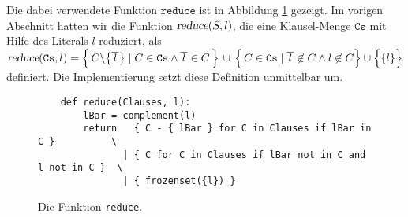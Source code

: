 Die dabei verwendete Funktion $\texttt{reduce}$ ist in Abbildung \ref{fig:reduce} gezeigt.
Im vorigen Abschnitt hatten wir die Funktion $\textsl{reduce}(S, l)$, die eine
Klausel-Menge $\texttt{Cs}$ mit Hilfe des Literals $l$ reduziert, als
\\[0.2cm]
\hspace*{1.3cm}
$\textsl{reduce}(\texttt{Cs},l)  = 
 \Bigl\{\, C \backslash \bigl\{\overline{\,l\,}\bigr\} \;|\; C \in \texttt{Cs} \wedge \overline{\,l\,} \in C \,\Bigr\} 
       \,\cup\, \Bigl\{\, C \in \texttt{Cs} \mid \overline{\,l\,} \not\in C \wedge l \not\in C \Bigr\} \cup \Bigl\{\{l\}\Bigr\}
$
\\[0.2cm]
definiert.
Die Implementierung setzt diese Definition unmittelbar um.  


\begin{figure}[!ht]
  \centering
\begin{verbatim}
    def reduce(Clauses, l):
        lBar = complement(l)
        return   { C - { lBar } for C in Clauses if lBar in C }          \
               | { C for C in Clauses if lBar not in C and l not in C }  \
               | { frozenset({l}) }
\end{verbatim}
\vspace*{-0.3cm}
  \caption{Die Funktion \texttt{reduce}. }
  \label{fig:reduce}
\end{figure} 

